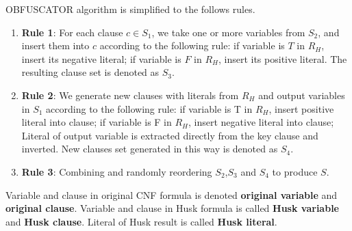 \documentclass[runningheads,a4paper]{llncs}
\begin{document}
OBFUSCATOR algorithm is simplified to the follows rules. 

\begin{enumerate}
\item \textbf{Rule 1}:
For each clause $c\in S_1$,
we take one or more variables from $S_2$,
and insert them into $c$ according to the following rule:
if variable is $T$ in $R_H$, insert its negative literal;
if variable is $F$ in $R_H$, insert its positive literal. 
The resulting clause set is denoted as $S_3$.
\item \textbf{Rule 2}: 
We generate new clauses with literals from $R_H$ and output variables in $S_1$ according to the following rule: 
if variable is T in $R_H$, insert positive literal into clause;
if variable is F in $R_H$, insert negative literal into clause;
Literal of output variable is extracted directly from the key clause and inverted.
New clauses set generated in this way is denoted as $S_4$.
\item \textbf{Rule 3}: 
Combining and randomly reordering $S_2$,$S_3$ and $S_4$ to produce $S$.
\end{enumerate}




\begin{definition}
Variable and clause in original CNF formula is denoted \textbf{original variable} and \textbf{original clause}.
Variable and clause in Husk formula is called \textbf{Husk variable} and \textbf{Husk clause}. 
Literal of Husk result is called \textbf{Husk literal}.
\end{definition}


\end{document}
